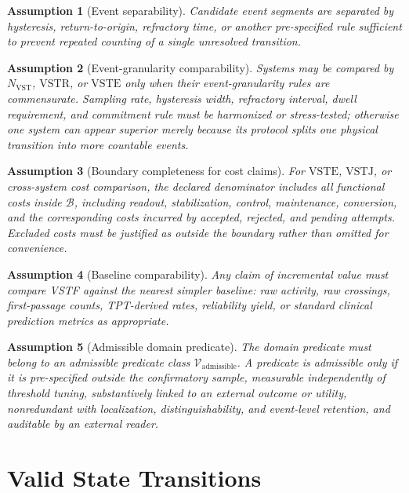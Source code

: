\documentclass[11pt,a4paper]{article}
\newtheorem{assumption}{Assumption}
\newcommand{\VST}{\ensuremath{\mathrm{VST}}}
\newcommand{\VSTR}{\ensuremath{\mathrm{VSTR}}}
\newcommand{\VSTE}{\ensuremath{\mathrm{VSTE}}}
\newcommand{\VSTJ}{\ensuremath{\mathrm{VSTJ}}}
\newcommand{\1}{\mathbf{1}}
\begin{document}
\begin{assumption}[Event separability]
Candidate event segments are separated by hysteresis, return-to-origin, refractory time, or another pre-specified rule sufficient to prevent repeated counting of a single unresolved transition.
\end{assumption}

\begin{assumption}[Event-granularity comparability]
Systems may be compared by $N_{\VST}$, \VSTR{}, or \VSTE{} only when their event-granularity rules are commensurate. Sampling rate, hysteresis width, refractory interval, dwell requirement, and commitment rule must be harmonized or stress-tested; otherwise one system can appear superior merely because its protocol splits one physical transition into more countable events.
\end{assumption}

\begin{assumption}[Boundary completeness for cost claims]
For \VSTE{}, \VSTJ{}, or cross-system cost comparison, the declared denominator includes all functional costs inside $\mathcal{B}$, including readout, stabilization, control, maintenance, conversion, and the corresponding costs incurred by accepted, rejected, and pending attempts. Excluded costs must be justified as outside the boundary rather than omitted for convenience.
\end{assumption}

\begin{assumption}[Baseline comparability]
Any claim of incremental value must compare VSTF against the nearest simpler baseline: raw activity, raw crossings, first-passage counts, TPT-derived rates, reliability yield, or standard clinical prediction metrics as appropriate.
\end{assumption}

\begin{assumption}[Admissible domain predicate]
The domain predicate must belong to an admissible predicate class $\mathcal{V}_{\mathrm{admissible}}$. A predicate is admissible only if it is pre-specified outside the confirmatory sample, measurable independently of threshold tuning, substantively linked to an external outcome or utility, nonredundant with localization, distinguishability, and event-level retention, and auditable by an external reader.
\end{assumption}

\section{Valid State Transitions}
\end{document}
